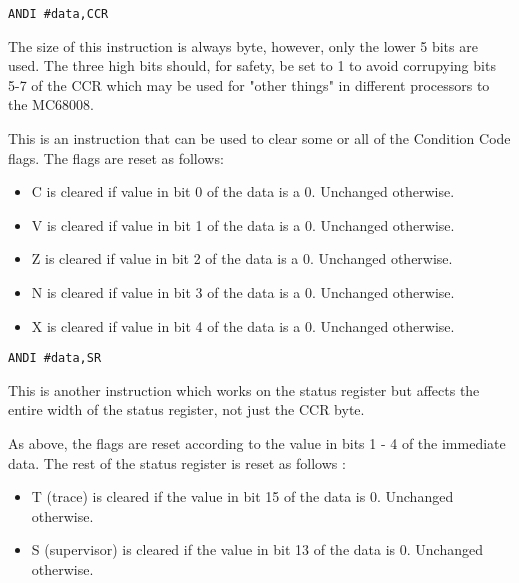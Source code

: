 \begin{lstlisting}[firstnumber=1,]
          ANDI #data,CCR 
\end{lstlisting}

The size of this instruction is always byte, however, only the lower 5 bits are used. The 
   three high bits should, for safety, be set to 1 to avoid corrupying bits 5-7 of the CCR 
   which may be used for "other things" in different processors to the MC68008.

This is an instruction that can be used to clear some or all of
    the Condition Code flags. The flags are reset as follows:
\begin{itemize}[itemsep=0pt]

\item{}C is cleared if value in bit 0 of the data is a 0. Unchanged otherwise.


\item{}V is cleared if value in bit 1 of the data is a 0. Unchanged otherwise.


\item{}Z is cleared if value in bit 2 of the data is a 0. Unchanged otherwise.


\item{}N is cleared if value in bit 3 of the data is a 0. Unchanged otherwise.


\item{}X is cleared if value in bit 4 of the data is a 0. Unchanged otherwise.

\end{itemize}

\begin{lstlisting}[firstnumber=1,]
          ANDI #data,SR
\end{lstlisting}

This is another instruction which works on the status register but
    affects the entire width of the status register, not just the CCR
    byte.

As above, the flags are reset according to the value in bits 1 -{} 4
    of the immediate data. The rest of the status register is reset as follows
   :
\begin{itemize}[itemsep=0pt]

\item{}T (trace) is cleared if the value in bit 15 of the data is
        0. Unchanged otherwise.


\item{}S (supervisor) is cleared if the value in bit 13 of the data is
        0. Unchanged otherwise.

\end{itemize}

